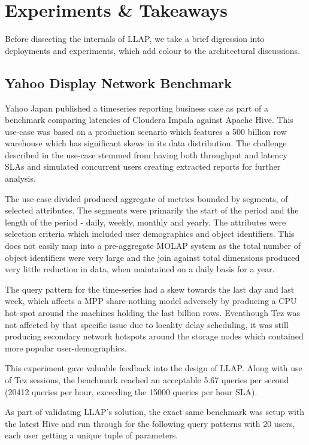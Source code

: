 \section{Experiments \& Takeaways}

Before dissecting the internals of LLAP, we take a brief digression into deployments and experiments, 
which add colour to the architectural discussions. 

\subsection{Yahoo Display Network Benchmark}

Yahoo Japan published a timeseries reporting business case as part of a benchmark\cite{impala_perf} comparing
latencies of Cloudera Impala\cite{impala} against Apache Hive. This use-case was based on a production scenario
which features a 500 billion row warehouse which has significant skews in its data distribution. The challenge 
described in the use-case stemmed from having both throughput and latency SLAs and simulated concurrent users
creating extracted reports for further analysis.

The use-case divided produced aggregate of metrics bounded by segments, of selected attributes. The segments 
were primarily the start of the period and the length of the period - daily, weekly, monthly and yearly. The 
attributes were selection criteria which included user demographics and object identifiers. This does not 
easily map into a pre-aggregate MOLAP system as the total number of object identifiers were very large and 
the join against total dimensions produced very little reduction in data, when maintained on a daily basis for
a year.

The query pattern for the time-series had a skew towards the last day and last week, which affects a MPP share-nothing
model adversely by producing a CPU hot-spot around the machines holding the last billion rows. Eventhough Tez was not
affected by that specific issue due to locality delay scheduling, it was still producing secondary network hotspots
around the storage nodes which contained more popular user-demographics. 

This experiment gave valuable feedback into the design of LLAP. Along with use of Tez sessions, the benchmark 
reached an acceptable 5.67 queries per second (20412 queries per hour, exceeding the 15000 queries per hour SLA).

As part of validating LLAP's solution, the exact same benchmark was setup with the latest Hive and run through for the following
query patterns with 20 users, each user getting a unique tuple of parameters.


